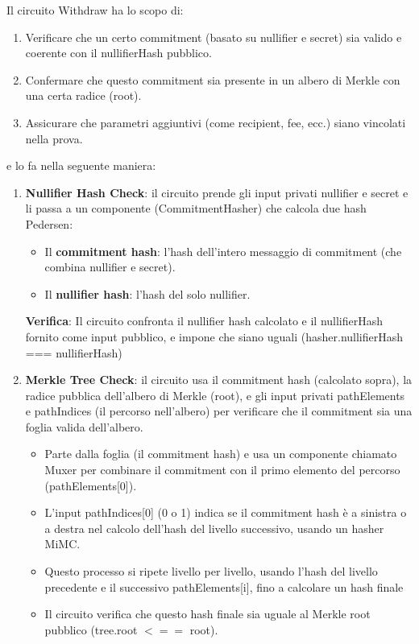 Il circuito Withdraw ha lo scopo di:
\begin{enumerate}
    \item Verificare che un certo commitment (basato su nullifier e secret) sia valido e coerente con il nullifierHash pubblico.
    \item Confermare che questo commitment sia presente in un albero di Merkle con una certa radice (root).
    \item Assicurare che parametri aggiuntivi (come recipient, fee, ecc.) siano vincolati nella prova.
\end{enumerate}

e lo fa nella seguente maniera:

\begin{enumerate}
    \item \textbf{Nullifier Hash Check}: il circuito prende gli input privati nullifier e secret e li passa a un componente (CommitmentHasher) che calcola due hash Pedersen:
        \begin{itemize}
            \item Il \textbf{commitment hash}: l'hash dell'intero messaggio di commitment (che combina nullifier e secret).
            \item Il \textbf{nullifier hash}: l'hash del solo nullifier.
        \end{itemize}
        \textbf{Verifica}: Il circuito confronta il nullifier hash calcolato e il nullifierHash fornito come input pubblico, e impone che siano uguali (hasher.nullifierHash === nullifierHash)
    \item \textbf{Merkle Tree Check}: il circuito usa il commitment hash (calcolato sopra), la radice pubblica dell'albero di Merkle (root), e gli input privati pathElements e pathIndices (il percorso nell'albero) per verificare che il commitment sia una foglia valida dell'albero.
    \begin{itemize}
        \item Parte dalla foglia (il commitment hash) e usa un componente chiamato Muxer per combinare il commitment con il primo elemento del percorso (pathElements[0]).
        \item L'input pathIndices[0] (0 o 1) indica se il commitment hash è a sinistra o a destra nel calcolo dell'hash del livello successivo, usando un hasher MiMC.
        \item Questo processo si ripete livello per livello, usando l'hash del livello precedente e il successivo pathElements[i], fino a calcolare un hash finale
        \item Il circuito verifica che questo hash finale sia uguale al Merkle root pubblico (tree.root $<==$ root).

\end{itemize}
\end{enumerate}
